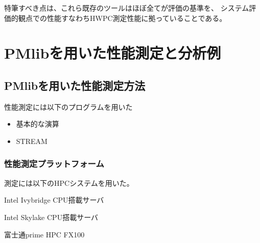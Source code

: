 \documentclass[submit,techrep,noauthor]{ipsj}
\begin{document}
特筆すべき点は、これら既存のツールはほぼ全てが評価の基準を、
システム評価的観点での性能すなわちHWPC測定性能に拠っていることである。


\section{PMlibを用いた性能測定と分析例}

\subsection{PMlibを用いた性能測定方法}


性能測定には以下のプログラムを用いた
\begin{itemize}
\item{基本的な演算}
\item{STREAM}
\end{itemize}


\subsubsection{性能測定プラットフォーム}

測定には以下のHPCシステムを用いた。
\begin{itemize}
{
\item Intel Ivybridge CPU搭載サーバ
\item Intel Skylake CPU搭載サーバ
\item 富士通prime HPC FX100
}
\end{itemize}
\end{document}
